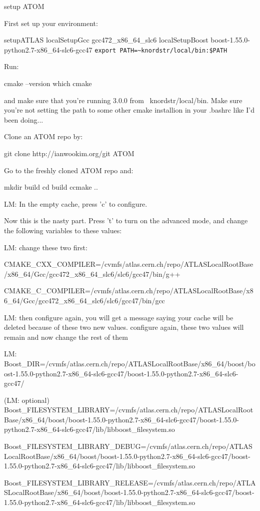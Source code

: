 setup ATOM

First set up your environment:

setupATLAS
localSetupGcc gcc472_x86_64_slc6
localSetupBoost boost-1.55.0-python2.7-x86_64-slc6-gcc47
\lstinline|export PATH=~knordstr/local/bin:$PATH| %

Run:

cmake --version
which cmake

and make sure that you're running 3.0.0 from ~knordstr/local/bin. Make sure you're not setting the path to some other cmake installion in your .bashrc like I'd been doing...

Clone an ATOM repo by:

git clone http://ianwookim.org/git ATOM

Go to the freshly cloned ATOM repo and:

mkdir build
cd build
ccmake ..

LM: In the empty cache, press 'c' to configure.

Now this is the nasty part. Press 't' to turn on the advanced mode, and change the following variables to these values:

LM: change these two first:

CMAKE_CXX_COMPILER=/cvmfs/atlas.cern.ch/repo/ATLASLocalRootBase/x86_64/Gcc/gcc472_x86_64_slc6/slc6/gcc47/bin/g++

CMAKE_C_COMPILER=/cvmfs/atlas.cern.ch/repo/ATLASLocalRootBase/x86_64/Gcc/gcc472_x86_64_slc6/slc6/gcc47/bin/gcc

LM: then configure again, you will get a message saying your cache will be deleted because of these two new values. configure again, these two values will remain and now change the rest of them

LM: Boost_DIR=/cvmfs/atlas.cern.ch/repo/ATLASLocalRootBase/x86_64/boost/boost-1.55.0-python2.7-x86_64-slc6-gcc47/boost-1.55.0-python2.7-x86_64-slc6-gcc47/

(LM: optional) Boost_FILESYSTEM_LIBRARY=/cvmfs/atlas.cern.ch/repo/ATLASLocalRootBase/x86_64/boost/boost-1.55.0-python2.7-x86_64-slc6-gcc47/boost-1.55.0-python2.7-x86_64-slc6-gcc47/lib/libboost_filesystem.so

Boost_FILESYSTEM_LIBRARY_DEBUG=/cvmfs/atlas.cern.ch/repo/ATLASLocalRootBase/x86_64/boost/boost-1.55.0-python2.7-x86_64-slc6-gcc47/boost-1.55.0-python2.7-x86_64-slc6-gcc47/lib/libboost_filesystem.so

Boost_FILESYSTEM_LIBRARY_RELEASE=/cvmfs/atlas.cern.ch/repo/ATLASLocalRootBase/x86_64/boost/boost-1.55.0-python2.7-x86_64-slc6-gcc47/boost-1.55.0-python2.7-x86_64-slc6-gcc47/lib/libboost_filesystem.so

